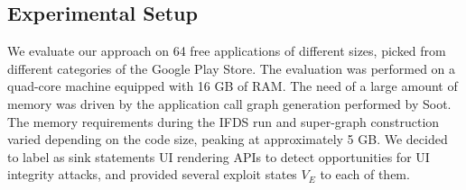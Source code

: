 \subsection{Experimental Setup}
We evaluate our approach on 64 free applications of different sizes, picked from different categories of the Google Play Store. The evaluation was performed on a quad-core machine equipped with 16 GB of RAM. The need of a large amount of memory was driven by the application call graph generation performed by Soot. The memory requirements during the IFDS run and super-graph construction varied depending on the code size, peaking at approximately 5 GB. We decided to label as sink statements UI rendering APIs to detect opportunities for UI integrity attacks, and provided several exploit states $V_E$ to each of them.


